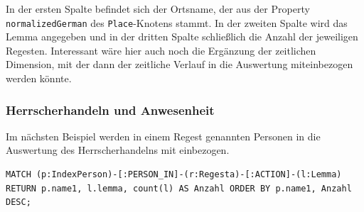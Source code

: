 \documentclass[12pt,ngerman,]{article}
\begin{document}
In der ersten Spalte befindet sich der Ortsname, der aus der Property
\texttt{normalizedGerman} des \texttt{Place}-Knotens stammt. In der
zweiten Spalte wird das Lemma angegeben und in der dritten Spalte
schließlich die Anzahl der jeweiligen Regesten. Interessant wäre hier
auch noch die Ergänzung der zeitlichen Dimension, mit der dann der
zeitliche Verlauf in die Auswertung miteinbezogen werden könnte.

\subsubsection{Herrscherhandeln und
Anwesenheit}\label{herrscherhandeln-und-anwesenheit}

Im nächsten Beispiel werden in einem Regest genannten Personen in die
Auswertung des Herrscherhandelns mit einbezogen.

\begin{verbatim}
MATCH (p:IndexPerson)-[:PERSON_IN]-(r:Regesta)-[:ACTION]-(l:Lemma)
RETURN p.name1, l.lemma, count(l) AS Anzahl ORDER BY p.name1, Anzahl DESC;
\end{verbatim}
\end{document}
